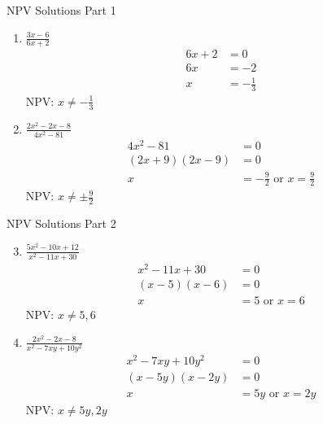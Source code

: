 \documentclass[aspectratio=169]{beamer}
\begin{document}
\begin{frame}{NPV Solutions Part 1}
\begin{tcolorbox}[colback=lightgray,colframe=accent,title=Detailed Solutions]
\footnotesize
\begin{enumerate}
  \item $\frac{3x - 6}{6x + 2}$
  \begin{align*}
    6x + 2 &= 0 \\
    6x &= -2 \\
    x &= -\frac{1}{3}
  \end{align*}
  NPV: $x \neq -\frac{1}{3}$

  \item $\frac{2x^2 - 2x - 8}{4x^2 - 81}$
  \begin{align*}
    4x^2 - 81 &= 0 \\
    (2x+9)(2x-9) &= 0 \\
    x &= -\frac{9}{2} \text{ or } x = \frac{9}{2}
  \end{align*}
  NPV: $x \neq \pm\frac{9}{2}$
\end{enumerate}
\end{tcolorbox}
\end{frame}

\begin{frame}{NPV Solutions Part 2}
\begin{tcolorbox}[colback=lightgray,colframe=accent,title=Detailed Solutions]
\footnotesize
\begin{enumerate}
  \setcounter{enumi}{2}
  \item $\frac{5x^2 - 10x + 12}{x^2 - 11x + 30}$
  \begin{align*}
    x^2 - 11x + 30 &= 0 \\
    (x-5)(x-6) &= 0 \\
    x &= 5 \text{ or } x = 6
  \end{align*}
  NPV: $x \neq 5, 6$

  \item $\frac{2x^2 - 2x - 8}{x^2 - 7xy + 10y^2}$
  \begin{align*}
    x^2 - 7xy + 10y^2 &= 0 \\
    (x-5y)(x-2y) &= 0 \\
    x &= 5y \text{ or } x = 2y
  \end{align*}
  NPV: $x \neq 5y, 2y$
\end{enumerate}
\end{tcolorbox}
\end{frame}
\end{document}
